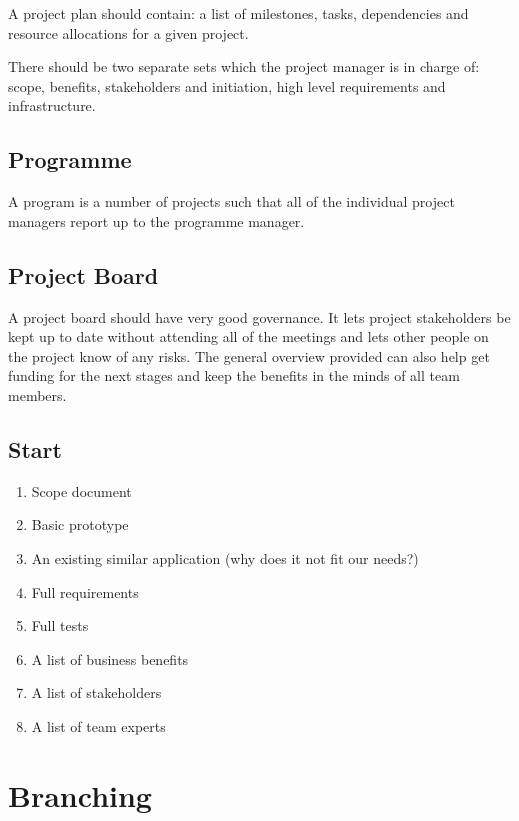 A project plan should contain: a list of milestones, tasks, dependencies and resource allocations for a given project.

There should be two separate sets which the project manager is in charge of: scope, benefits, stakeholders and initiation, high level requirements and infrastructure.

\subsection{Programme}\label{sub:programme}

A program is a number of projects such that all of the individual project managers report up to the programme manager.

\subsection{Project Board}\label{sub:project_board}

A project board should have very good governance.
It lets project stakeholders be kept up to date without attending all of the meetings and lets other people on the project know of any risks.
The general overview provided can also help get funding for the next stages and keep the benefits in the minds of all team members.

\subsection{Start}\label{sub:start}

\begin{enumerate}
	\item Scope document
	\item Basic prototype
	\item An existing similar application (why does it not fit our needs?)
	\item Full requirements
	\item Full tests
	\item A list of business benefits
	\item A list of stakeholders
	\item A list of team experts
\end{enumerate}

\section{Branching}\label{sec:branching}

